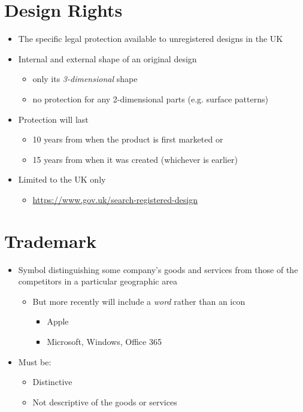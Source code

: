 \documentclass{article}
\begin{document}
\section{Design Rights}
\begin{itemize}
\item The specific legal protection available to unregistered designs in the UK
\item Internal and external shape of an original design
\begin{itemize}
\item only its \emph{3-dimensional} shape
\item no protection for any 2-dimensional parts (e.g. surface patterns)
\end{itemize}
\item Protection will last
\begin{itemize}
\item 10 years from when the product is first marketed or 
\item 15 years from when it was created (whichever is earlier)
\end{itemize}
\item Limited to the UK only
\begin{itemize}
\item \url{https://www.gov.uk/search-registered-design}
\end{itemize}
\end{itemize}



\section{Trademark}
\begin{itemize}
\item Symbol distinguishing some company's goods and services from those of the competitors in a particular geographic area 
\begin{itemize}
\item But more recently will include a \emph{word} rather than an icon
\begin{itemize}
\item Apple 
\item Microsoft, Windows, Office 365
\end{itemize}
\end{itemize}
\item Must be: 
\begin{itemize}
\item Distinctive 
\item Not descriptive of the goods or services
\end{itemize}
\end{itemize}
\end{document}
